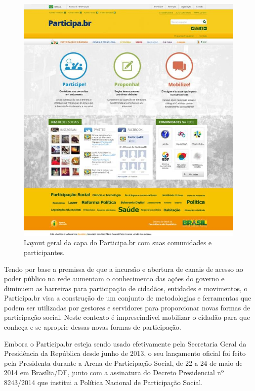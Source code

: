 \documentclass{article}
\begin{document}
\begin{figure}[h]
  \center
  \includegraphics[scale=0.4]{imagens/screenshot-participa.png}
  \caption{Layout geral da capa do Participa.br com suas comunidades e participantes.}
  \label{screenshot-participa}
\end{figure}

Tendo por base a premissa de que a incursão e abertura de canais de acesso ao
poder público na rede aumentam o conhecimento das ações do governo e diminuem
as barreiras para participação de cidadãos, entidades e movimentos, o
Participa.br visa a construção de um conjunto de metodologias e ferramentas que
podem ser utilizadas por gestores e servidores para proporcionar novas formas
de participação social. Neste contexto é imprescindível mobilizar o cidadão
para que conheça e se aproprie dessas novas formas de participação.

Embora o Participa.br esteja sendo usado efetivamente pela Secretaria Geral
da Presidência da República desde junho de 2013, o seu lançamento oficial foi
feito pela Presidenta durante a Arena de Participação Social, de 22 a 24 de
maio de 2014 em Brasília/DF, junto com a assinatura do Decreto Presidencial nº
8243/2014 que institui a Política Nacional de Participação Social.
\end{document}
